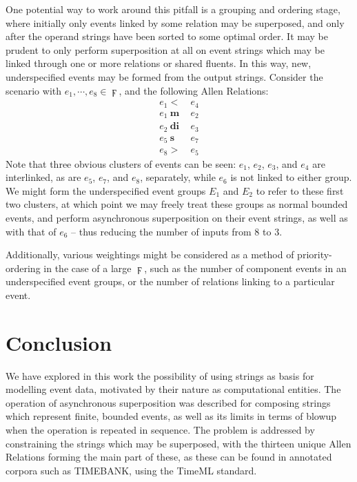 \documentclass[a4paper,11pt]{article}
\begin{document}
One potential way to work around this pitfall is a grouping and ordering stage, 
where initially only events linked by some relation may be superposed, and only 
after the operand strings have been sorted to some optimal order. It may be 
prudent to only perform superposition at all on event strings which may be 
linked through one or more relations or shared fluents. In this way, new, 
underspecified events may be formed from the output strings. Consider the 
scenario with $e_1, \cdots, e_8 \in \digamma$, and the following Allen 
Relations:
\begin{align*}
e_1 <& ~e_4\\
e_1 ~\mathbf{m}& ~e_2\\
e_2 ~\mathbf{di}& ~e_3\\
e_5 ~\mathbf{s}& ~e_7\\
e_8 >& ~e_5
\end{align*}
Note that three obvious clusters of events can be seen: $e_1$, $e_2$, $e_3$, 
and $e_4$ 
are interlinked, as are $e_5$, $e_7$, and $e_8$, separately, while $e_6$ is not 
linked to either group. We might form the underspecified event groups $E_1$ and 
$E_2$ to refer to these first two clusters, at which point we may freely treat 
these groups as normal bounded events, and perform asynchronous superposition 
on their event strings, as well as with that of $e_6$ -- thus reducing the 
number of inputs from 8 to 3.

Additionally, various weightings might be considered as a method of 
priority-ordering in the case of a large $\digamma$, such as the number of 
component events in an underspecified event groups, or the number of relations 
linking to a particular event.
\section{Conclusion}
We have explored in this work the possibility of using strings as basis for 
modelling event data, motivated by their nature as computational entities. The 
operation of asynchronous superposition was described for composing strings 
which represent finite, bounded events, as well as its limits in terms of 
blowup when the operation is repeated in sequence. The problem is addressed by 
constraining the strings which may be superposed, with the thirteen unique 
Allen Relations forming the main part of these, as these can be found in 
annotated corpora such as TIMEBANK, using the TimeML standard.
\end{document}
